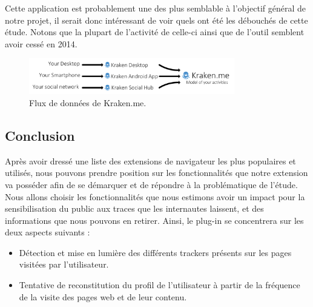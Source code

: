 			Cette application est probablement une des plus semblable à l'objectif général de notre projet, il serait donc intéressant de voir quels ont été les débouchés de cette étude. Notons que la plupart de l'activité de celle-ci ainsi que de l'outil semblent avoir cessé en 2014.

			\begin{figure}[h]
				\centering
				\includegraphics[width=0.8\textwidth]{images/analysis/krakenme}
				\caption{Flux de données de Kraken.me\cite{krakenme}.}
				\label{a-krakenme}
			\end{figure}

	\subsection{Conclusion}

		Après avoir dressé une liste des extensions de navigateur les plus populaires et utilisés, nous pouvons prendre position sur les fonctionnalités que notre extension va posséder afin de se démarquer et de répondre à la problématique de l'étude. Nous allons choisir les fonctionnalités que nous estimons avoir un impact pour la sensibilisation du public aux traces que les internautes laissent, et des informations que nous pouvons en retirer. Ainsi, le plug-in se concentrera sur les deux aspects suivants :

		\begin{itemize}
			\item Détection et mise en lumière des différents trackers présents sur les pages visitées par l'utilisateur.
			\item Tentative de reconstitution du profil de l'utilisateur à partir de la fréquence de la visite des pages web et de leur contenu.
		\end{itemize}
